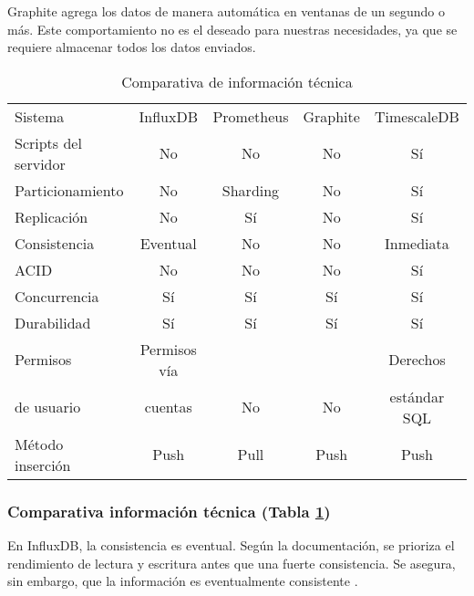 Graphite agrega los datos de manera automática en ventanas de un segundo o más. Este comportamiento no es el deseado 
para nuestras necesidades, ya que se requiere almacenar todos los datos enviados.

\begin{table}[H]
    \begin{center}
        \begin{adjustbox}{max width=\textwidth}
            \begin{tabular}{l c c c c}
                \toprule
                Sistema & InfluxDB & Prometheus & Graphite & TimescaleDB \\
                \otoprule
                Scripts del servidor & No & No & No & Sí \\
                \rowcolor{gray!35}
                Particionamiento & No & Sharding & No & Sí \\
                Replicación & No & Sí & No & Sí \\
                \rowcolor{gray!35}
                Consistencia & Eventual & No & No & Inmediata \\
                ACID& No & No & No & Sí \\
                \rowcolor{gray!35}
                Concurrencia & Sí & Sí & Sí & Sí \\
                Durabilidad & Sí & Sí & Sí & Sí \\
                \rowcolor{gray!35}
                Permisos                   & Permisos vía    &                      &                      & Derechos \\
                \rowcolor{gray!35}
                de usuario & cuentas & \multirow{-2}{*}{No} & \multirow{-2}{*}{No} & estándar SQL \\
                Método inserción & Push & Pull & Push & Push \\
                \bottomrule
            \end{tabular}
        \end{adjustbox}
        \caption{Comparativa de información técnica}
        \label{tabla:tisgbd}
    \end{center}
\end{table}

\subsubsection{Comparativa información técnica (Tabla \ref{tabla:tisgbd})} En InfluxDB, la consistencia es eventual. Según
la documentación, se prioriza el rendimiento de lectura y escritura antes que una fuerte consistencia. Se asegura, sin 
embargo, que la información es eventualmente consistente \cite{influx:consistency}.

